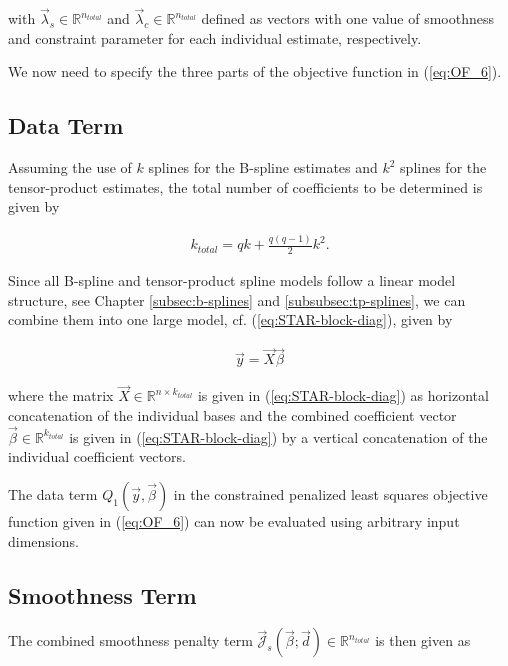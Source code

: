 \documentclass[10pt,a4paper]{report}
\begin{document}
with $\vec{\lambda}_s \in \mathbb{R}^{n_{total}}$ and  $\vec{\lambda}_c \in \mathbb{R}^{n_{total}}$  defined as vectors with one value of smoothness and constraint parameter for each individual estimate, respectively. 

We now need to specify the three parts of the objective function in (\ref{eq:OF_6}). 

\subsection{Data Term}

Assuming the use of $k$ splines for the B-spline estimates and $k^2$ splines for the tensor-product estimates, the total number of coefficients to be determined is given by 

\begin{align}\label{eq:tps_total_number_of_coef}
	k_{total} = qk + \frac{q(q-1)}{2}k^2. 
\end{align}

Since all B-spline and tensor-product spline models follow a linear model structure, see Chapter \ref{subsec:b-splines} and \ref{subsubsec:tp-splines}, we can combine them into one large model, cf. (\ref{eq:STAR-block-diag}), given by

\begin{align}\label{eq:tps_lin_mod}
	\vec{y} = \vec{X} \vec{\beta}
\end{align}

where the matrix $\vec{X} \in \mathbb{R}^{n \times k_{total}}$ is given in (\ref{eq:STAR-block-diag}) as horizontal concatenation of the individual bases and the combined coefficient vector $\vec{\beta} \in \mathbb{R}^{k_{total}}$ is given in (\ref{eq:STAR-block-diag}) by a vertical concatenation of the individual coefficient vectors. 

The data term $Q_1(\vec{y}, \vec{\beta})$ in the constrained penalized least squares objective function given in (\ref{eq:OF_6}) can now be evaluated using arbitrary input dimensions. 

\subsection{Smoothness Term}

The combined smoothness penalty term $\vec{\mathcal{J}}_s(\vec{\beta}; \vec{d}) \in \mathbb{R}^{n_{total}}$ is then given as
\end{document}
